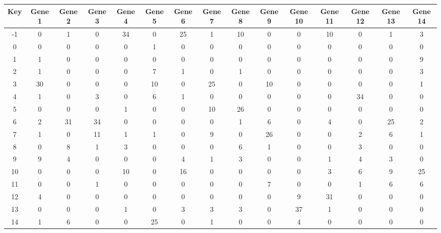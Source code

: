 \begin{tabular}{|c|c|c|c|c|c|c|c|c|c|c|c|c|c|c|}
\hline
Key & Gene 1 & Gene 2 & Gene 3 & Gene 4 & Gene 5 & Gene 6 & Gene 7 & Gene 8 & Gene 9 & Gene 10 & Gene 11 & Gene 12 & Gene 13 & Gene 14 \\
\hline
-1 & 0 & 1 & 0 & 34 & 0 & 25 & 1 & 10 & 0 & 0 & 10 & 0 & 1 & 3 \\
0 & 0 & 0 & 0 & 0 & 1 & 0 & 0 & 0 & 0 & 0 & 0 & 0 & 0 & 0 \\
1 & 1 & 0 & 0 & 0 & 0 & 0 & 0 & 0 & 0 & 0 & 0 & 0 & 0 & 9 \\
2 & 1 & 0 & 0 & 0 & 7 & 1 & 0 & 1 & 0 & 0 & 0 & 0 & 0 & 3 \\
3 & 30 & 0 & 0 & 0 & 10 & 0 & 25 & 0 & 10 & 0 & 0 & 0 & 0 & 1 \\
4 & 1 & 0 & 3 & 0 & 6 & 1 & 0 & 0 & 0 & 0 & 0 & 34 & 0 & 0 \\
5 & 0 & 0 & 0 & 1 & 0 & 0 & 10 & 26 & 0 & 0 & 0 & 0 & 0 & 0 \\
6 & 2 & 31 & 34 & 0 & 0 & 0 & 0 & 1 & 6 & 0 & 4 & 0 & 25 & 2 \\
7 & 1 & 0 & 11 & 1 & 1 & 0 & 9 & 0 & 26 & 0 & 0 & 2 & 6 & 1 \\
8 & 0 & 8 & 1 & 3 & 0 & 0 & 0 & 6 & 1 & 0 & 0 & 3 & 0 & 0 \\
9 & 9 & 4 & 0 & 0 & 0 & 4 & 1 & 3 & 0 & 0 & 1 & 4 & 3 & 0 \\
10 & 0 & 0 & 0 & 10 & 0 & 16 & 0 & 0 & 0 & 0 & 3 & 6 & 9 & 25 \\
11 & 0 & 0 & 1 & 0 & 0 & 0 & 0 & 0 & 7 & 0 & 0 & 1 & 6 & 6 \\
12 & 4 & 0 & 0 & 0 & 0 & 0 & 0 & 0 & 0 & 9 & 31 & 0 & 0 & 0 \\
13 & 0 & 0 & 0 & 1 & 0 & 3 & 3 & 3 & 0 & 37 & 1 & 0 & 0 & 0 \\
14 & 1 & 6 & 0 & 0 & 25 & 0 & 1 & 0 & 0 & 4 & 0 & 0 & 0 & 0 \\
\hline
\end{tabular}